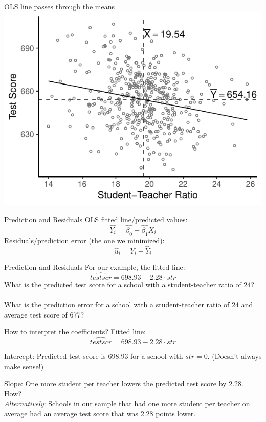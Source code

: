 \documentclass{./../div_teaching_slides}
\begin{document}
\begin{frame}{OLS line passes through the means}
\centering
\includegraphics{./../../output/lrm_caschool_means.pdf}
\end{frame}

\begin{frame}{Prediction and Residuals}
\vfill
OLS fitted line/predicted values:
$$ \hat{Y_i} = \hat{\beta_0} + \hat{\beta_1} X_i $$
Residuals/prediction error (the one we minimized):
$$ \hat{u}_i = Y_i-\hat{Y}_i $$  
\vfill
\end{frame}

\begin{frame}{Prediction and Residuals}
\vfill
For our example, the fitted line:
$$ \hat{testscr} = 698.93 -2.28 \cdot str $$
What is the predicted test score for a school with a student-teacher ratio of 24? \\~\\
What is the prediction error for a school with a student-teacher ratio of 24 and average test score of 677?
\vfill
\end{frame}

\begin{frame}{How to interpret the coefficients?}
Fitted line:
$$ \hat{testscr} = 698.93 -2.28 \cdot str $$
\begin{witemize}
  \item Intercept: Predicted test score is 698.93 for a school with $str=0$. (Doesn't always make sense!)
  \item Slope: One more student per teacher lowers the predicted test score by 2.28. How? \\ \vspace{0.25em}
   \textit{Alternatively}: Schools in our sample that had one more student per teacher on average had an average test score that was 2.28 points lower.
\end{witemize}
\end{frame}
\end{document}
